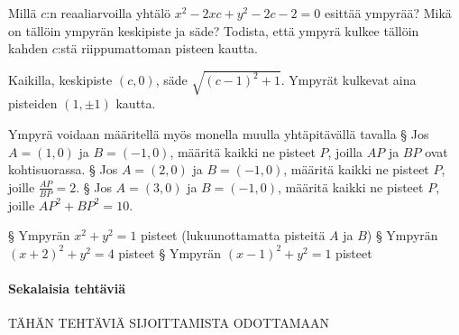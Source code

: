 \begin{tehtavasivu}
\begin{tehtava}
	Millä $c$:n reaaliarvoilla yhtälö $x^2-2xc+y^2-2c-2 = 0$ esittää ympyrää? Mikä on tällöin ympyrän keskipiste ja säde? Todista, että ympyrä kulkee tällöin kahden $c$:stä riippumattoman pisteen kautta.
	\begin{vastaus}
		Kaikilla, keskipiste $(c,0)$, säde $\sqrt{(c-1)^2+1}$. Ympyrät kulkevat aina pisteiden $(1,\pm 1)$ kautta.
	\end{vastaus}
\end{tehtava}

\begin{tehtava}
	Ympyrä voidaan määritellä myös monella muulla yhtäpitävällä tavalla
	\alakohdat
		§ Jos $A = (1,0)$ ja $B = (-1,0)$, määritä kaikki ne pisteet $P$, joilla $AP$ ja $BP$ ovat kohtisuorassa.
		§ Jos $A = (2,0)$ ja $B = (-1,0)$, määritä kaikki ne pisteet $P$, joille $\frac{AP}{BP} = 2$.
		§ Jos $A = (3,0)$ ja $B = (-1,0)$, määritä kaikki ne pisteet $P$, joille $AP^2+BP^2 = 10$.
	\loppu
	\begin{vastaus}
		\alakohdat
			§ Ympyrän $x^2+y^2 = 1$ pisteet (lukuunottamatta pisteitä $A$ ja $B$)
			§ Ympyrän $(x+2)^2+y^2 = 4$ pisteet
			§ Ympyrän $(x-1)^2+y^2 = 1$ pisteet
		\loppu
	\end{vastaus}
\end{tehtava}

\paragraph*{Sekalaisia tehtäviä}

TÄHÄN TEHTÄVIÄ SIJOITTAMISTA ODOTTAMAAN







\end{tehtavasivu}
